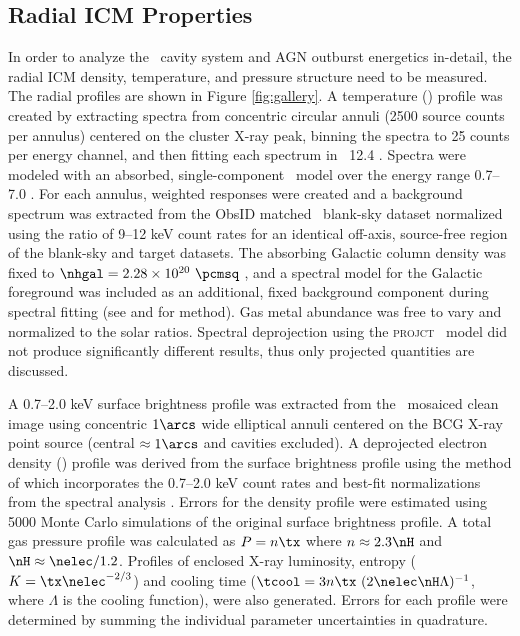 \documentclass[apjpt4]{aastex}
\begin{document}
\subsection{Radial ICM Properties}
\label{sec:icm}

In order to analyze the \rbs\ cavity system and AGN outburst
energetics in-detail, the radial ICM density, temperature, and
pressure structure need to be measured. The radial profiles are shown
in Figure \ref{fig:gallery}. A temperature (\tx) profile was created
by extracting spectra from concentric circular annuli (2500 source
counts per annulus) centered on the cluster X-ray peak, binning the
spectra to 25 counts per energy channel, and then fitting each
spectrum in \xspec\ 12.4 \citep{xspec}. Spectra were modeled with an
absorbed, single-component \mekal\ model \citep{mekal1} over the
energy range 0.7--7.0 \keV. For each annulus, weighted responses were
created and a background spectrum was extracted from the ObsID matched
\caldb\ blank-sky dataset normalized using the ratio of 9--12 keV
count rates for an identical off-axis, source-free region of the
blank-sky and target datasets. The absorbing Galactic column density
was fixed to $\nhgal = 2.28 \times 10^{20} ~\pcmsq$ \citep{lab}, and a
spectral model for the Galactic foreground was included as an
additional, fixed background component during spectral fitting (see
\citealt{2005ApJ...628..655V} and \citealt{xrayband} for method). Gas
metal abundance was free to vary and normalized to the \citet{ag89}
solar ratios. Spectral deprojection using the {\textsc{projct}}
\xspec\ model did not produce significantly different results, thus
only projected quantities are discussed.

A 0.7--2.0 keV surface brightness profile was extracted from the
\cxo\ mosaiced clean image using concentric $1\arcs$ wide elliptical
annuli centered on the BCG X-ray point source (central $\approx
1\arcs$ and cavities excluded). A deprojected electron density
(\nelec) profile was derived from the surface brightness profile using
the method of \citet{kriss83} which incorporates the 0.7--2.0 keV
count rates and best-fit normalizations from the spectral analysis
\citep[see][for details]{accept}. Errors for the density profile were
estimated using 5000 Monte Carlo simulations of the original surface
brightness profile. A total gas pressure profile was calculated as $P
= n \tx$ where $n \approx 2.3 \nH$ and $\nH \approx
\nelec/1.2$. Profiles of enclosed X-ray luminosity, entropy ($K = \tx
\nelec^{-2/3}$) and cooling time ($\tcool = 3 n \tx~(2 \nelec \nH
\Lambda)^{-1}$, where $\Lambda$ is the cooling function), were also
generated. Errors for each profile were determined by summing the
individual parameter uncertainties in quadrature.
\end{document}
